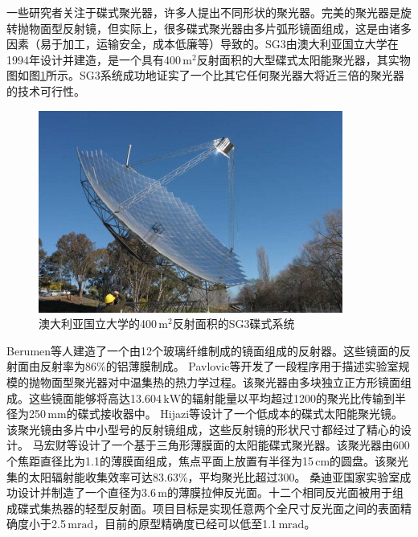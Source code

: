 一些研究者关注于碟式聚光器，许多人提出不同形状的聚光器。完美的聚光器是旋转抛物面型反射镜，但实际上，很多碟式聚光器由多片弧形镜面组成，这是由诸多因素（易于加工，运输安全，成本低廉等）导致的。SG3由澳大利亚国立大学在1994年设计并建造，是一个具有400$\,\mathrm{m^2}$反射面积的大型碟式太阳能聚光器，其实物图如图\ref{fig:LargeDish}所示\cite{Lovegrove2011}。SG3系统成功地证实了一个比其它任何聚光器大将近三倍的聚光器的技术可行性。
\begin{figure}[!ht]
\centering
\includegraphics[width=.8\textwidth]{fig/largeDish.jpg}
\caption{澳大利亚国立大学的400$\,\mathrm{m^2}$反射面积的SG3碟式系统}\label{fig:LargeDish}
\end{figure}
Berumen等人\cite{Berumen2004}建造了一个由12个玻璃纤维制成的镜面组成的反射器。这些镜面的反射面由反射率为86\%的铝薄膜制成。
Pavlovic等\cite{Pavlovic2014}开发了一段程序用于描述实验室规模的抛物面型聚光器对中温集热的热力学过程。该聚光器由多块独立正方形镜面组成。这些镜面能够将高达13.604$\,\mathrm{kW}$的辐射能量以平均超过1200的聚光比传输到半径为250$\,\mathrm{mm}$的碟式接收器中。
Hijazi等\cite{Hijazi2016}设计了一个低成本的碟式太阳能聚光镜。该聚光镜由多片中小型号的反射镜组成，这些反射镜的形状尺寸都经过了精心的设计。
马宏财等\cite{Ma2012}设计了一个基于三角形薄膜面的太阳能碟式聚光器。该聚光器由600个焦距直径比为1.1的薄膜面组成，焦点平面上放置有半径为15$\,\mathrm{cm}$的圆盘。该聚光集的太阳辐射能收集效率可达83.63\%，平均聚光比超过300。
桑迪亚国家实验室\cite{Schertz1991}成功设计并制造了一个直径为3.6$\,\mathrm{m}$的薄膜拉伸反光面。十二个相同反光面被用于组成碟式集热器的轻型反射面。项目目标是实现任意两个全尺寸反光面之间的表面精确度小于2.5$\,\mathrm{mrad}$，目前的原型精确度已经可以低至1.1$\,\mathrm{mrad}$。

